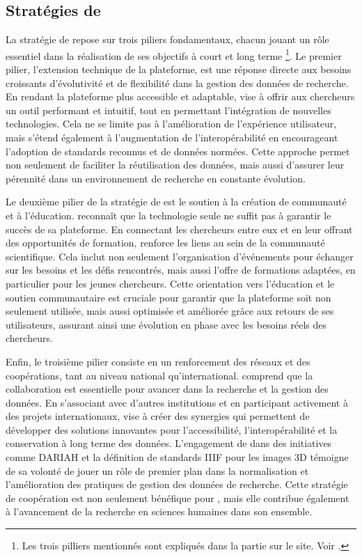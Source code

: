         \subsection{Stratégies de \dsc}
        La stratégie de \dsc repose sur trois piliers fondamentaux, chacun jouant un rôle essentiel dans la réalisation de ses objectifs à court et long terme \footnote{Les trois pilliers mentionnés sont expliqués dans la partie  sur le site. Voir \cite{daschstrategicgoals}.}. Le premier pilier, l'extension technique de la plateforme, est une réponse directe aux besoins croissants d'évolutivité et de flexibilité dans la gestion des données de recherche. En rendant la plateforme plus accessible et adaptable, \dsc vise à offrir aux chercheurs un outil performant et intuitif, tout en permettant l'intégration de nouvelles technologies. Cela ne se limite pas à l'amélioration de l'expérience utilisateur, mais s'étend également à l'augmentation de l'interopérabilité en encourageant l'adoption de standards reconnus et de données normées. Cette approche permet non seulement de faciliter la réutilisation des données, mais aussi d'assurer leur pérennité dans un environnement de recherche en constante évolution.
        
        Le deuxième pilier de la stratégie de \dsc est le soutien à la création de communauté et à l'éducation. \dsc reconnaît que la technologie seule ne suffit pas à garantir le succès de sa plateforme. En connectant les chercheurs entre eux et en leur offrant des opportunités de formation, \dsc renforce les liens au sein de la communauté scientifique. Cela inclut non seulement l'organisation d'événements pour échanger sur les besoins et les défis rencontrés, mais aussi l'offre de formations adaptées, en particulier pour les jeunes chercheurs. Cette orientation vers l'éducation et le soutien communautaire est cruciale pour garantir que la plateforme \dsc soit non seulement utilisée, mais aussi optimisée et améliorée grâce aux retours de ses utilisateurs, assurant ainsi une évolution en phase avec les besoins réels des chercheurs.
        
        Enfin, le troisième pilier consiste en un renforcement des réseaux et des coopérations, tant au niveau national qu'international. \dsc comprend que la collaboration est essentielle pour avancer dans la recherche et la gestion des données. En s'associant avec d'autres institutions et en participant activement à des projets internationaux, \dsc vise à créer des synergies qui permettent de développer des solutions innovantes pour l'accessibilité, l'interopérabilité et la conservation à long terme des données. L'engagement de \dsc dans des initiatives comme DARIAH et la définition de standards IIIF pour les images 3D témoigne de sa volonté de jouer un rôle de premier plan dans la normalisation et l'amélioration des pratiques de gestion des données de recherche. Cette stratégie de coopération est non seulement bénéfique pour \dsc, mais elle contribue également à l'avancement de la recherche en sciences humaines dans son ensemble.


